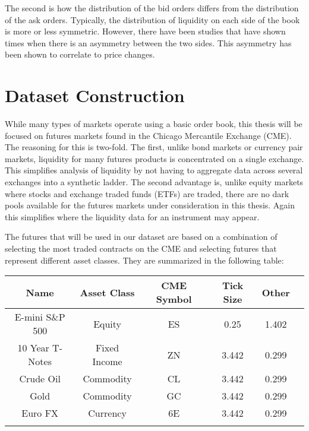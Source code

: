 

The second is how the distribution of the bid orders differs from the distribution of the ask orders. Typically, the distribution of liquidity on each side of the book is more or less symmetric. However, there have been studies that have shown times when there is an asymmetry between the two sides. This asymmetry has been shown to correlate to price changes. 


\section{Dataset Construction}

While many types of markets operate using a basic order book, this thesis will be focused on futures markets found in the Chicago Mercantile Exchange (CME). The reasoning for this is two-fold. The first, unlike bond markets or currency pair markets, liquidity for many futures products is concentrated on a single exchange. This simplifies analysis of liquidity by not having to aggregate data across several exchanges into a synthetic ladder. The second advantage is, unlike equity markets where stocks and exchange traded funds (ETFs) are traded, there are no dark pools available for the futures markets under consideration in this thesis. Again this simplifies where the liquidity data for an instrument may appear.

The futures that will be used in our dataset are based on a combination of selecting the most traded contracts on the CME and selecting futures that represent different asset classes. They are summarized in the following table:

\begin{center}
\begin{tabular}{SSSSSS} \toprule
    {Name} & {Asset Class} & {CME Symbol} & {Tick Size} & {Other}  \\ \midrule
    {E-mini S\&P 500}  & {Equity} & {ES} & 0.25 & 1.402  \\
    {10 Year T-Notes}  & {Fixed Income}  & {ZN} & 3.442  & 0.299  \\
    {Crude Oil}  & {Commodity}  & {CL} & 3.442  & 0.299  \\
    {Gold} & {Commodity}  & {GC} & 3.442  & 0.299  \\
    {Euro FX}  & {Currency}  & {6E} & 3.442  & 0.299  \\ \bottomrule
\label{futures}
\end{tabular}
\end{center}

